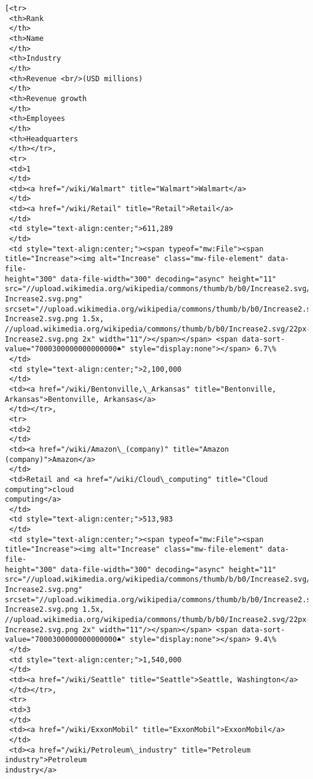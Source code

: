 \documentclass[11pt]{article}
\makeatletter
\newcommand{\boxspacing}{\kern\kvtcb@left@rule\kern\kvtcb@boxsep}
\newcommand{\prompt}[4]{
        {\ttfamily\llap{{\color{#2}[#3]:\hspace{3pt}#4}}\vspace{-\baselineskip}}
    }
\makeatother
\begin{document}
            \begin{tcolorbox}[breakable, size=fbox, boxrule=.5pt, pad at break*=1mm, opacityfill=0]
\prompt{Out}{outcolor}{87}{\boxspacing}
\begin{Verbatim}[commandchars=\\\{\}]
[<tr>
 <th>Rank
 </th>
 <th>Name
 </th>
 <th>Industry
 </th>
 <th>Revenue <br/>(USD millions)
 </th>
 <th>Revenue growth
 </th>
 <th>Employees
 </th>
 <th>Headquarters
 </th></tr>,
 <tr>
 <td>1
 </td>
 <td><a href="/wiki/Walmart" title="Walmart">Walmart</a>
 </td>
 <td><a href="/wiki/Retail" title="Retail">Retail</a>
 </td>
 <td style="text-align:center;">611,289
 </td>
 <td style="text-align:center;"><span typeof="mw:File"><span
title="Increase"><img alt="Increase" class="mw-file-element" data-file-
height="300" data-file-width="300" decoding="async" height="11"
src="//upload.wikimedia.org/wikipedia/commons/thumb/b/b0/Increase2.svg/11px-
Increase2.svg.png"
srcset="//upload.wikimedia.org/wikipedia/commons/thumb/b/b0/Increase2.svg/17px-
Increase2.svg.png 1.5x,
//upload.wikimedia.org/wikipedia/commons/thumb/b/b0/Increase2.svg/22px-
Increase2.svg.png 2x" width="11"/></span></span> <span data-sort-
value="7000300000000000000♠" style="display:none"></span> 6.7\%
 </td>
 <td style="text-align:center;">2,100,000
 </td>
 <td><a href="/wiki/Bentonville,\_Arkansas" title="Bentonville,
Arkansas">Bentonville, Arkansas</a>
 </td></tr>,
 <tr>
 <td>2
 </td>
 <td><a href="/wiki/Amazon\_(company)" title="Amazon (company)">Amazon</a>
 </td>
 <td>Retail and <a href="/wiki/Cloud\_computing" title="Cloud computing">cloud
computing</a>
 </td>
 <td style="text-align:center;">513,983
 </td>
 <td style="text-align:center;"><span typeof="mw:File"><span
title="Increase"><img alt="Increase" class="mw-file-element" data-file-
height="300" data-file-width="300" decoding="async" height="11"
src="//upload.wikimedia.org/wikipedia/commons/thumb/b/b0/Increase2.svg/11px-
Increase2.svg.png"
srcset="//upload.wikimedia.org/wikipedia/commons/thumb/b/b0/Increase2.svg/17px-
Increase2.svg.png 1.5x,
//upload.wikimedia.org/wikipedia/commons/thumb/b/b0/Increase2.svg/22px-
Increase2.svg.png 2x" width="11"/></span></span> <span data-sort-
value="7000300000000000000♠" style="display:none"></span> 9.4\%
 </td>
 <td style="text-align:center;">1,540,000
 </td>
 <td><a href="/wiki/Seattle" title="Seattle">Seattle, Washington</a>
 </td></tr>,
 <tr>
 <td>3
 </td>
 <td><a href="/wiki/ExxonMobil" title="ExxonMobil">ExxonMobil</a>
 </td>
 <td><a href="/wiki/Petroleum\_industry" title="Petroleum industry">Petroleum
industry</a>

\end{Verbatim}
\end{tcolorbox}
\end{document}
